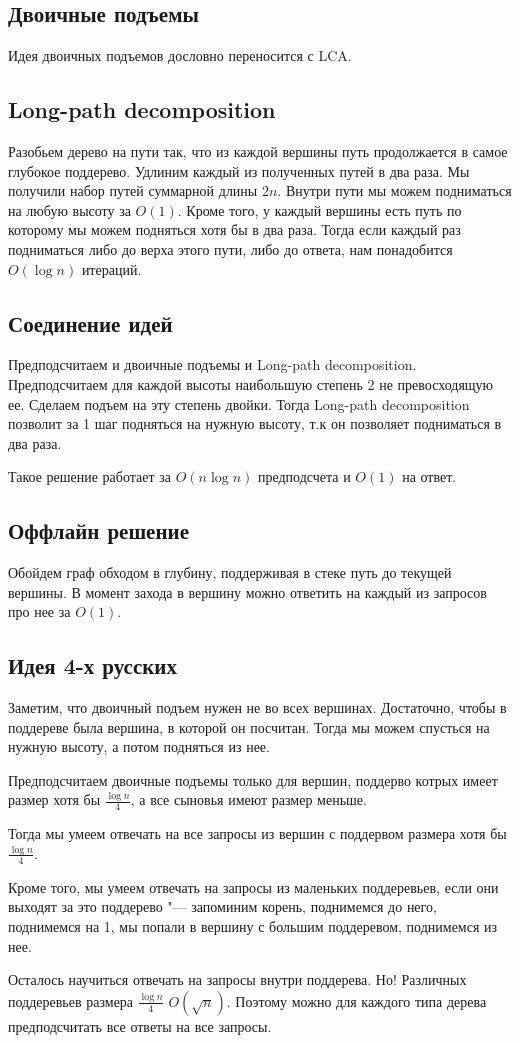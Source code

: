 \documentclass[12pt,a4paper]{article}
\theoremstyle{plain}
\begin{document}
\subsection{Двоичные подъемы} Идея двоичных подъемов дословно переносится с LCA.

\subsection{Long-path decomposition}
Разобьем дерево на пути так, что из каждой вершины путь продолжается
в самое глубокое поддерево.
Удлиним каждый из полученных путей в два раза.
Мы получили набор путей суммарной длины $2n$. Внутри пути мы можем подниматься на
любую высоту за $O(1)$. Кроме того, у каждый вершины есть путь по которому мы можем подняться 
хотя бы в два раза. 
Тогда если каждый раз подниматься либо до верха этого пути, либо до ответа, нам понадобится $O(\log{n})$ итераций.

\subsection{Соединение идей}

Предподсчитаем и двоичные подъемы и Long-path decomposition.
Предподсчитаем для каждой высоты наибольшую степень 2 не превосходящую
ее. Сделаем подъем на эту степень двойки.
Тогда Long-path decomposition позволит за 1 шаг подняться на нужную высоту,
т.к он позволяет подниматься в два раза.

Такое решение работает за $O(n\log{n})$ предподсчета и $O(1)$ на ответ.

\subsection{Оффлайн решение}

Обойдем граф обходом в глубину, поддерживая в стеке путь до текущей вершины.
В момент захода в вершину можно ответить на каждый из запросов про нее за $O(1)$.

\subsection{Идея 4-х русских}

Заметим, что двоичный подъем нужен не во всех вершинах.
Достаточно, чтобы в поддереве была вершина, в которой он посчитан.
Тогда мы можем спусться на нужную высоту, а потом подняться из нее.

Предподсчитаем двоичные подъемы только для вершин, поддерво котрых
имеет размер хотя бы $\frac{\log{n}}{4}$, а все сыновья имеют размер меньше.

Тогда мы умеем отвечать на все запросы из вершин с поддервом размера хотя бы $\frac{\log{n}}{4}$.

Кроме того, мы умеем отвечать на запросы из маленьких поддеревьев, если они выходят за это поддерево "---
запоминим корень, поднимемся до него, поднимемся на 1, мы попали в вершину с большим поддеревом,
поднимемся из нее.

Осталось научиться отвечать на запросы внутри поддерева.
Но! Различных поддеревьев размера $\frac{\log{n}}{4}$ $O(\sqrt{n})$. Поэтому можно для
каждого типа дерева предподсчитать все ответы на все запросы.
\end{document}
